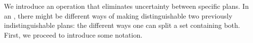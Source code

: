 


We introduce an operation that eliminates uncertainty between specific
plans.  In an {\ults}, there might be different ways of
making distinguishable two previously indistinguishable plans:  the
different ways one can split a set containing both. First,
we proceed to introduce some notation.

